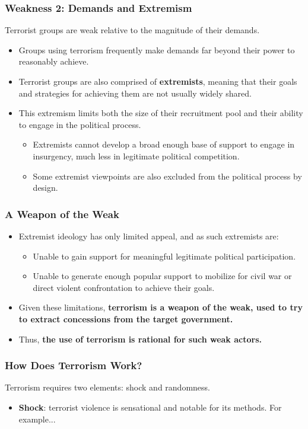 \documentclass{beamer}
\begin{document}
\begin{frame} 
\frametitle{\LARGE{Weakness 2: Demands and Extremism}}
Terrorist groups are weak relative to the magnitude of their demands.
\begin{itemize}
		\item Groups using terrorism frequently make demands far beyond their power to reasonably achieve. \pause 
		\item Terrorist groups are also comprised of \textbf{extremists}, meaning that their goals and strategies for achieving them are not usually widely shared. \pause 
		\item This extremism limits both the size of their recruitment pool and their ability to engage in the political process. \pause
		\begin{itemize}
			\item Extremists cannot develop a broad enough base of support to engage in insurgency, much less in legitimate political competition. \pause
			\item Some extremist viewpoints are also excluded from the political process by design.
		\end{itemize} 
\end{itemize}
\end{frame}

\begin{frame} 
	\frametitle{\LARGE{A Weapon of the Weak}}
	\begin{itemize}
		\item Extremist ideology has only limited appeal, and as such extremists are: 
		\begin{itemize}
			\item Unable to gain support for meaningful legitimate political participation. \pause
			\item Unable to generate enough popular support to mobilize for civil war or direct violent confrontation to achieve their goals. \pause
		\end{itemize}
	\item Given these limitations, \textbf{terrorism is a weapon of the weak, used to try to extract concessions from the target government.}
	\item Thus, \textbf{the use of terrorism is rational for such weak actors.}		
	\end{itemize}
\end{frame}

\begin{frame} 
	\frametitle{\LARGE{How Does Terrorism Work?}}
Terrorism requires two elements: shock and randomness.
	\begin{itemize}
		\item \textbf{Shock}: terrorist violence is sensational and notable for its methods. For example...		
	\end{itemize}
\end{frame}
\end{document}
